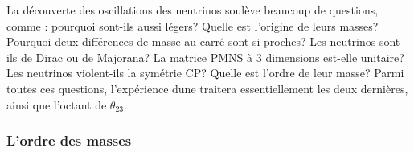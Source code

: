       La découverte des oscillations des neutrinos soulève beaucoup de questions, comme : pourquoi sont-ils aussi légers? Quelle est l'origine de leurs masses? Pourquoi deux différences de masse au carré sont si proches? Les neutrinos sont-ils de Dirac ou de Majorana? La matrice PMNS à 3 dimensions est-elle unitaire? Les neutrinos violent-ils la symétrie CP? Quelle est l'ordre de leur masse? Parmi toutes ces questions, l'expérience \gls{dune} traitera essentiellement les deux dernières, ainsi que l'octant de $\theta_{23}$.

%		        
%	            
%	            


      \subsubsection{L'ordre des masses}\label{sec::hierarchy}

